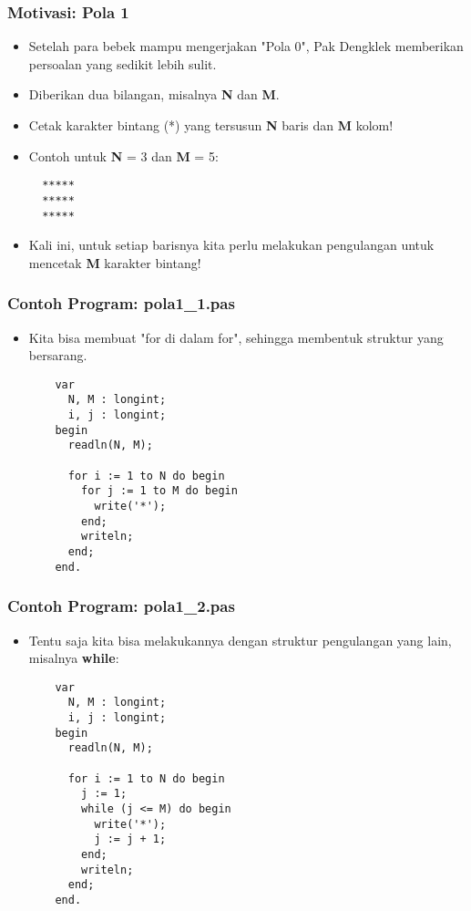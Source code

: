 \begin{frame}[fragile]
\frametitle{Motivasi: Pola 1}
\begin{itemize}
  \item Setelah para bebek mampu mengerjakan "Pola 0", Pak Dengklek memberikan persoalan yang sedikit lebih sulit.
  \item Diberikan dua bilangan, misalnya \textbf{N} dan \textbf{M}.
  \item Cetak karakter bintang (*) yang tersusun \textbf{N} baris dan \textbf{M} kolom!

  \item Contoh untuk \textbf{N} = 3 dan \textbf{M} = 5:
  \begin{lstlisting}
  *****
  *****
  *****
  \end{lstlisting}

  \item Kali ini, untuk setiap barisnya kita perlu melakukan pengulangan untuk mencetak \textbf{M} karakter bintang!
\end{itemize}
\end{frame}

\begin{frame}[fragile]
\frametitle{Contoh Program: pola1\_1.pas}
\begin{itemize}
  \item Kita bisa membuat "for di dalam for", sehingga membentuk struktur yang bersarang.
  \begin{lstlisting}
    var
      N, M : longint;
      i, j : longint;
    begin
      readln(N, M);

      for i := 1 to N do begin
        for j := 1 to M do begin
          write('*');
        end;
        writeln;
      end;
    end.
  \end{lstlisting}
\end{itemize}
\end{frame}

\begin{frame}[fragile]
\frametitle{Contoh Program: pola1\_2.pas}
\begin{itemize}
  \item Tentu saja kita bisa melakukannya dengan struktur pengulangan yang lain, misalnya \textbf{while}:
  \begin{lstlisting}
    var
      N, M : longint;
      i, j : longint;
    begin
      readln(N, M);

      for i := 1 to N do begin
        j := 1;
        while (j <= M) do begin
          write('*');
          j := j + 1;
        end;
        writeln;
      end;
    end.
  \end{lstlisting}
\end{itemize}
\end{frame}

